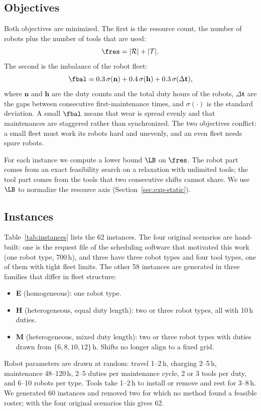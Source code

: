 \subsection{Objectives}
\label{sec:problem:objectives}

Both objectives are minimized.
The first is the resource count, \ie the number of robots plus the number of tools that are used:
\begin{equation}
  \fres = |\mathcal{R}| + |\mathcal{T}|.
\end{equation}
The second is the imbalance of the robot fleet:
\begin{equation}
  \fbal = 0.3\,\sigma(\mathbf{n}) + 0.4\,\sigma(\mathbf{h}) + 0.3\,\sigma(\Delta\mathbf{t}),
\end{equation}
where $\mathbf{n}$ and $\mathbf{h}$ are the duty counts and the total duty hours of the robots,
$\Delta\mathbf{t}$ are the gaps between consecutive first-maintenance times, and $\sigma(\cdot)$ is the standard deviation.
A small $\fbal$ means that wear is spread evenly and that maintenances are staggered rather than synchronized.
The two objectives conflict: a small fleet must work its robots hard and unevenly, and an even fleet needs spare robots.

For each instance we compute a lower bound $\LB$ on $\fres$.
The robot part comes from an exact feasibility search on a relaxation with unlimited tools;
the tool part comes from the tools that two consecutive shifts cannot share.
We use $\LB$ to normalize the resource axis (Section~\ref{sec:exp-static}).

\subsection{Instances}
\label{sec:problem:instances}

Table~\ref{tab:instances} lists the 62 instances.
The four original scenarios are hand-built:
one is the request file of the scheduling software that motivated this work (one robot type, 700\,h),
and three have three robot types and four tool types, one of them with tight fleet limits.
The other 58 instances are generated in three families that differ in fleet structure:
\begin{itemize}
  \item \textbf{E} (homogeneous): one robot type.
  \item \textbf{H} (heterogeneous, equal duty length): two or three robot types, all with 10\,h duties.
  \item \textbf{M} (heterogeneous, mixed duty length): two or three robot types with duties drawn from $\{6,8,10,12\}$\,h.
        Shifts no longer align to a fixed grid.
\end{itemize}
Robot parameters are drawn at random: travel 1--2\,h, charging 2--5\,h, maintenance 48--120\,h,
2--5 duties per maintenance cycle, 2 or 3 tools per duty, and 6--10 robots per type.
Tools take 1--2\,h to install or remove and rest for 3--8\,h.
We generated 60 instances and removed two for which no method found a feasible roster; with the four original scenarios this gives 62.

